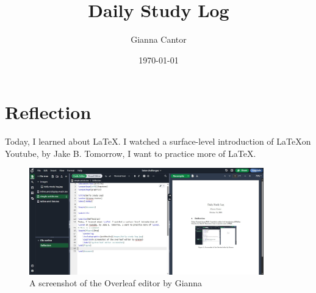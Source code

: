 \documentclass{article}
\title{Daily Study Log}
\author{Gianna Cantor}
\date{\today}
\begin{document}
\maketitle

\section{Reflection}
Today, I learned about \LaTeX. I watched a surface-level introduction of \LaTeX on Youtube, by Jake B. Tomorrow, I want to practice more of \LaTeX.
\begin{figure}[htp]
    \centering
    \includegraphics[width=4in]{images/daily-study-log.jpg}
    \caption{A screenshot of the Overleaf editor by Gianna}
    \label{fig:Overleaf editor screenshot}
\end{figure}
\end{document}
